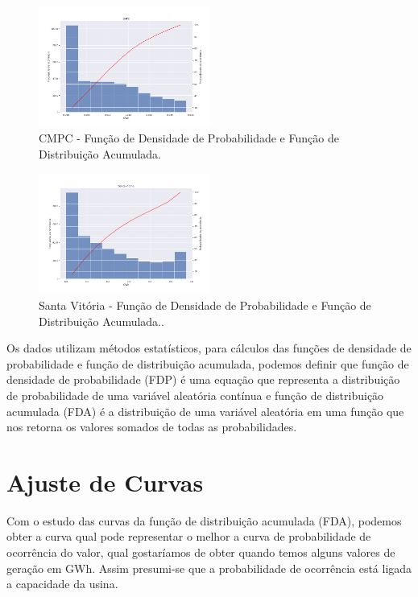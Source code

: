 \documentclass[conference]{IEEEtran}
\begin{document}
\begin{figure}[h]
\includegraphics[width=0.5\textwidth]{Figuras/CMPC.png}
\centering
\caption{CMPC - Função de Densidade de Probabilidade e Função de Distribuição Acumulada.}
\label{figura:CMPC FDP/FDA}
\end{figure}

\begin{figure}[h]
\includegraphics[width=0.5\textwidth]{Figuras/SantaVitoria.png}
\centering
\caption{Santa Vitória - Função de Densidade de Probabilidade e Função de Distribuição Acumulada..}
\label{figura:Santa Vitória FDP/FDA}
\end{figure}

Os dados utilizam métodos estatísticos, para cálculos das funções de densidade de probabilidade e função de distribuição acumulada, podemos definir que função de densidade de probabilidade (FDP) é uma equação que representa a distribuição de probabilidade de uma variável aleatória contínua e função de distribuição acumulada (FDA) é a distribuição de uma variável aleatória em uma função que nos retorna os valores somados de todas as probabilidades.

\section{Ajuste de Curvas}

Com o estudo das curvas da função de distribuição acumulada (FDA), podemos obter a curva qual pode representar o melhor a curva de probabilidade de ocorrência do valor, qual gostaríamos de obter quando temos alguns valores de geração em GWh. Assim presumi-se que a probabilidade de ocorrência está ligada a capacidade da usina.
\end{document}
